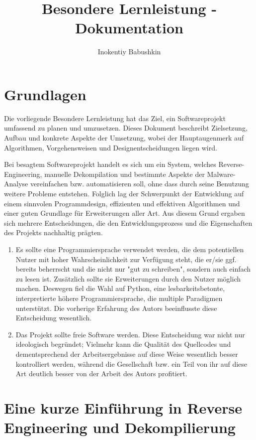 \documentclass[11pt]{article}
\title{Besondere Lernleistung - Dokumentation}
\author{Inokentiy Babushkin}
\date{}
\begin{document}

\section{Grundlagen}
Die vorliegende Besondere Lernleistung hat das Ziel, ein Softwareprojekt
umfassend zu planen und umzusetzen.
Dieses Dokument beschreibt Zielsetzung, Aufbau und konkrete Aspekte der Umsetzung,
wobei der Hauptaugenmerk auf Algorithmen, Vorgehensweisen und Designentscheidungen liegen wird.

Bei besagtem Softwareprojekt handelt es sich um ein System, welches Reverse-Engineering, manuelle
Dekompilation und bestimmte Aspekte der Malware-Analyse vereinfachen bzw. automatisieren soll,
ohne dass durch seine Benutzung weitere Probleme entstehen. Folglich lag der Schwerpunkt der Entwicklung
auf einem sinnvolen Programmdesign, effizienten und effektiven Algorithmen und einer guten Grundlage
für Erweiterungen aller Art. Aus diesem Grund ergaben sich mehrere Entscheidungen, die den Entwicklungsprozess
und die Eigenschaften des Projekts nachhaltig prägten.
\begin{enumerate}
	\item{Es sollte eine Programmiersprache verwendet werden, die dem potentiellen Nutzer mit hoher
		Wahrscheinlichkeit zur Verfügung steht, die er/sie ggf. bereits beherrscht und die nicht nur
		"gut zu schreiben", sondern auch einfach zu lesen ist. Zusätzlich sollte sie Erweiterungen
		durch den Nutzer möglich machen. Deswegen fiel die Wahl auf Python, eine lesbarkeitsbetonte,
		interpretierte höhere Programmiersprache, die multiple Paradigmen unterstützt.
		Die vorherige Erfahrung des Autors beeinflusste diese Entscheidung wesentlich.
	}
	\item{Das Projekt sollte freie Software werden. Diese Entscheidung war nicht nur ideologisch begründet;
		Vielmehr kann die Qualität des Quellcodes und dementsprechend der Arbeitsergebnisse auf diese Weise
		wesentlich besser kontrolliert werden, während die Gesellschaft bzw. ein Teil von ihr auf diese
		Art deutlich besser von der Arbeit des Autors profitiert.
	}
\end{enumerate}

\section{Eine kurze Einführung in Reverse Engineering und Dekompilierung}
\end{document}
